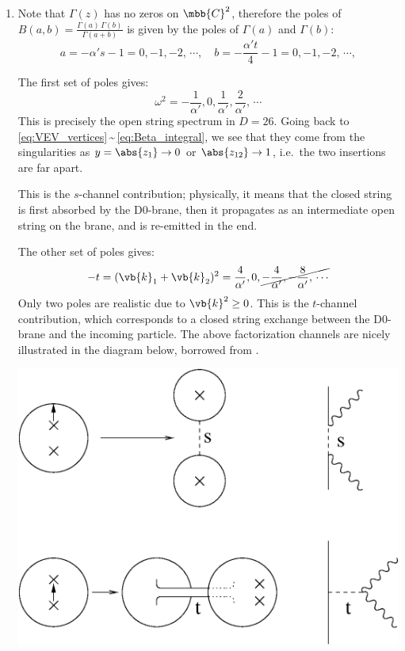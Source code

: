 \documentclass[a4paper,10pt]{article}
\begin{document}
\begin{enumerate}
\begin{enumerate}
	\item Note that $\Gamma(z)$ has no zeros on $\mbb{C}^2$, therefore the poles of $
		B(a,b) = \frac{\Gamma(a)\,\Gamma(b)}{\Gamma(a+b)}
	$ is given by the poles of $\Gamma(a)$ and $\Gamma(b)$:
	\begin{equation}
		a = -\alpha's - 1 = 0,-1,-2,\,\cdots,\quad
		b = -\frac{\alpha't}{4} - 1 = 0,-1,-2,\,\cdots,
	\end{equation}
	
	The first set of poles gives:
	\begin{equation}
		\omega^2 = -\frac{1}{\alpha'},0,
			\frac{1}{\alpha'},
			\frac{2}{\alpha'},\,\cdots
	\end{equation}
	This is precisely the open string spectrum in $D = 26$. Going back to \eqref{eq:VEV_vertices}\,\textasciitilde\,\eqref{eq:Beta_integral}, we see that they come from the singularities as $y = \abs{z_1}\to 0$ or $\abs{z_{12}}\to 1$, i.e.\ the two insertions are far apart. 
	
	This is the $s$-channel contribution; physically, it means that the closed string is first absorbed by the D0-brane, then it propagates as an intermediate open string on the brane, and is re-emitted in the end. 
	
	The other set of poles gives:
	\begin{equation}
		-t =  (\vb{k}_1 + \vb{k}_2)^2
		= \frac{4}{\alpha'},0,
			\cancel{
				-\frac{4}{\alpha'},
				-\frac{8}{\alpha'},\,\cdots
			}
	\end{equation}
	Only two poles are realistic due to $\vb{k}^2 \ge 0$. This is the $t$-channel contribution, which corresponds to a closed string exchange between the D0-brane and the incoming particle. The above factorization channels are nicely illustrated in the diagram below, borrowed from . 
	\begin{center}
	\includegraphics[width=.5\linewidth]{factorize.eps}
	\end{center}
	
	\end{enumerate}
	

\end{enumerate}
\end{document}
